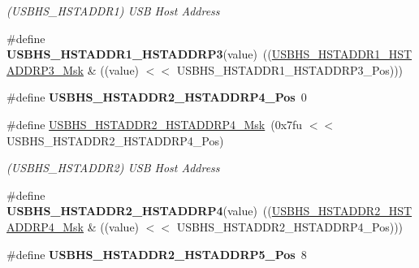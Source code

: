\begin{DoxyCompactItemize}
\begin{DoxyCompactList}\small\item\em (U\+S\+B\+H\+S\+\_\+\+H\+S\+T\+A\+D\+D\+R1) U\+SB Host Address \end{DoxyCompactList}\item 
\mbox{\label{group__SAME70__USBHS_ga0e6cd7201d7dc57bcb0ec67dd5a8b0a9}} 
\#define {\bfseries U\+S\+B\+H\+S\+\_\+\+H\+S\+T\+A\+D\+D\+R1\+\_\+\+H\+S\+T\+A\+D\+D\+R\+P3}(value)~((\mbox{\hyperlink{group__SAMV71__USBHS_gac393d1ef7204508fbd9ff3028522ffbd}{U\+S\+B\+H\+S\+\_\+\+H\+S\+T\+A\+D\+D\+R1\+\_\+\+H\+S\+T\+A\+D\+D\+R\+P3\+\_\+\+Msk}} \& ((value) $<$$<$ U\+S\+B\+H\+S\+\_\+\+H\+S\+T\+A\+D\+D\+R1\+\_\+\+H\+S\+T\+A\+D\+D\+R\+P3\+\_\+\+Pos)))
\item 
\mbox{\label{group__SAME70__USBHS_gaec3f333b445e6112fd3e29edf6ca4250}} 
\#define {\bfseries U\+S\+B\+H\+S\+\_\+\+H\+S\+T\+A\+D\+D\+R2\+\_\+\+H\+S\+T\+A\+D\+D\+R\+P4\+\_\+\+Pos}~0
\item 
\mbox{\label{group__SAME70__USBHS_ga420ac4febfb6b3450b97cd0e77e79f04}} 
\#define \mbox{\hyperlink{group__SAME70__USBHS_ga420ac4febfb6b3450b97cd0e77e79f04}{U\+S\+B\+H\+S\+\_\+\+H\+S\+T\+A\+D\+D\+R2\+\_\+\+H\+S\+T\+A\+D\+D\+R\+P4\+\_\+\+Msk}}~(0x7fu $<$$<$ U\+S\+B\+H\+S\+\_\+\+H\+S\+T\+A\+D\+D\+R2\+\_\+\+H\+S\+T\+A\+D\+D\+R\+P4\+\_\+\+Pos)
\begin{DoxyCompactList}\small\item\em (U\+S\+B\+H\+S\+\_\+\+H\+S\+T\+A\+D\+D\+R2) U\+SB Host Address \end{DoxyCompactList}\item 
\mbox{\label{group__SAME70__USBHS_gabbf6e6f34c9e82dee526b5f2d49322dc}} 
\#define {\bfseries U\+S\+B\+H\+S\+\_\+\+H\+S\+T\+A\+D\+D\+R2\+\_\+\+H\+S\+T\+A\+D\+D\+R\+P4}(value)~((\mbox{\hyperlink{group__SAMV71__USBHS_ga420ac4febfb6b3450b97cd0e77e79f04}{U\+S\+B\+H\+S\+\_\+\+H\+S\+T\+A\+D\+D\+R2\+\_\+\+H\+S\+T\+A\+D\+D\+R\+P4\+\_\+\+Msk}} \& ((value) $<$$<$ U\+S\+B\+H\+S\+\_\+\+H\+S\+T\+A\+D\+D\+R2\+\_\+\+H\+S\+T\+A\+D\+D\+R\+P4\+\_\+\+Pos)))
\item 
\mbox{\label{group__SAME70__USBHS_ga1127285ccfd83e8e4f9aa3ad3d3b78de}} 
\#define {\bfseries U\+S\+B\+H\+S\+\_\+\+H\+S\+T\+A\+D\+D\+R2\+\_\+\+H\+S\+T\+A\+D\+D\+R\+P5\+\_\+\+Pos}~8
$$
\end{DoxyCompactItemize}
